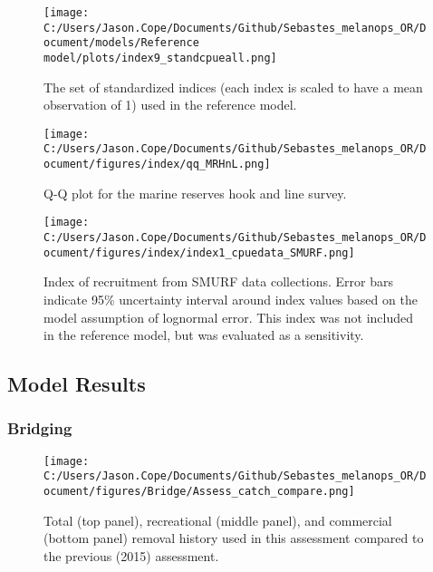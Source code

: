 \documentclass[11pt,
  letterpaper,
]{article}
\begin{document}
\clearpage

\begin{figure}
{\centering
\texttt{[image: C:/Users/Jason.Cope/Documents/Github/Sebastes\_melanops\_OR/Document/models/Reference model/plots/index9\_standcpueall.png]}
}
\caption{The set of standardized indices (each index is scaled to have a mean observation of 1) used in the reference model.\label{fig:sur-summ-all}}
\end{figure}

\newpage

\begin{figure}
{\centering
\texttt{[image: C:/Users/Jason.Cope/Documents/Github/Sebastes\_melanops\_OR/Document/figures/index/qq\_MRHnL.png]}
}
\caption{Q-Q plot for the marine reserves hook and line survey.\label{fig:qq_MRHnL}}
\end{figure}

\newpage

\begin{figure}
{\centering
\texttt{[image: C:/Users/Jason.Cope/Documents/Github/Sebastes\_melanops\_OR/Document/figures/index/index1\_cpuedata\_SMURF.png]}
}
\caption{Index of recruitment from SMURF data collections. Error bars indicate 95\% uncertainty interval around index values based on the model assumption of lognormal error. This index was not included in the reference model, but was evaluated as a sensitivity.\label{fig:index1_cpuedata_SMURF}}
\end{figure}

\newpage

\hypertarget{model-results}{%
\subsection{Model Results}\label{model-results}}

\hypertarget{bridging}{%
\subsubsection{Bridging}\label{bridging}}

\begin{figure}
{\centering
\texttt{[image: C:/Users/Jason.Cope/Documents/Github/Sebastes\_melanops\_OR/Document/figures/Bridge/Assess\_catch\_compare.png]}
}
\caption{Total (top panel), recreational (middle panel), and commercial (bottom panel) removal history used in this assessment compared to the previous (2015) assessment.\label{fig:catch-bridge}}
\end{figure}
\end{document}
